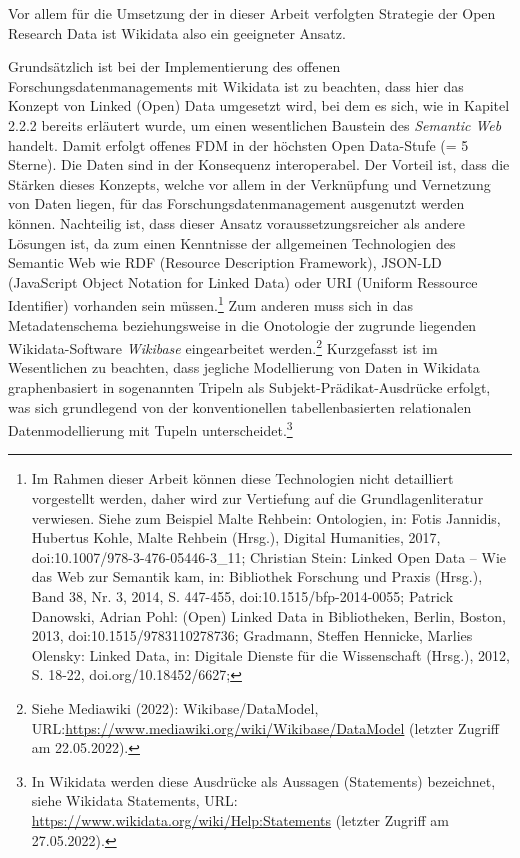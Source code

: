 Vor allem für die Umsetzung der in dieser Arbeit verfolgten Strategie der Open Research Data ist Wikidata also ein geeigneter Ansatz.

Grundsätzlich ist bei der Implementierung des offenen Forschungsdatenmanagements mit Wikidata ist zu beachten, dass hier das Konzept von Linked (Open) Data umgesetzt wird, bei dem es sich, wie in Kapitel 2.2.2 bereits erläutert wurde, um einen wesentlichen Baustein des \textit{Semantic Web} handelt. Damit erfolgt offenes FDM in der höchsten Open Data-Stufe (= 5 Sterne). Die Daten sind in der Konsequenz interoperabel. Der Vorteil ist, dass die Stärken dieses Konzepts, welche vor allem in der Verknüpfung und Vernetzung von Daten liegen, für das Forschungsdatenmanagement ausgenutzt werden können. Nachteilig ist, dass dieser Ansatz voraussetzungsreicher als andere Lösungen ist, da zum einen Kenntnisse der allgemeinen Technologien des Semantic Web wie RDF (Resource Description Framework), JSON-LD (JavaScript Object Notation for Linked Data) oder URI (Uniform Ressource Identifier) vorhanden sein müssen.\footnote{Im Rahmen dieser Arbeit können diese Technologien nicht detailliert vorgestellt werden, daher wird zur Vertiefung auf die Grundlagenliteratur verwiesen. Siehe zum Beispiel Malte Rehbein: Ontologien, in: Fotis Jannidis, Hubertus Kohle, Malte Rehbein (Hrsg.), Digital Humanities, 2017, doi:10.1007/978-3-476-05446-3\_11; Christian Stein: Linked Open Data – Wie das Web zur Semantik kam, in: Bibliothek Forschung und Praxis (Hrsg.), Band 38, Nr. 3, 2014, S. 447-455, doi:10.1515/bfp-2014-0055; Patrick Danowski, Adrian Pohl: (Open) Linked Data in Bibliotheken, Berlin, Boston, 2013, doi:10.1515/9783110278736; Gradmann, Steffen Hennicke, Marlies Olensky: Linked Data, in: Digitale Dienste für die Wissenschaft (Hrsg.), 2012, S. 18-22, doi.org/10.18452/6627;  } Zum anderen muss sich in das Metadatenschema beziehungsweise in die Onotologie der zugrunde liegenden Wikidata-Software \textit{Wikibase} eingearbeitet werden.\footnote{Siehe Mediawiki (2022): Wikibase/DataModel, URL:\url{https://www.mediawiki.org/wiki/Wikibase/DataModel} (letzter Zugriff am 22.05.2022).} Kurzgefasst ist im Wesentlichen zu beachten, dass jegliche Modellierung von Daten in Wikidata graphenbasiert in sogenannten Tripeln als Subjekt-Prädikat-Ausdrücke erfolgt, was sich grundlegend von der konventionellen tabellenbasierten relationalen Datenmodellierung mit Tupeln unterscheidet.\footnote{In Wikidata werden diese Ausdrücke als Aussagen (Statements) bezeichnet, siehe Wikidata Statements, URL: \url{https://www.wikidata.org/wiki/Help:Statements} (letzter Zugriff am 27.05.2022).}

